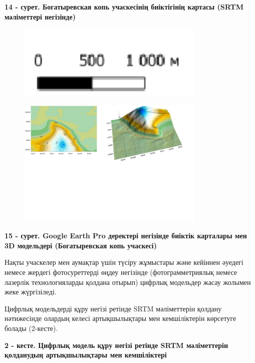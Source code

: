 {\bfseries 14 - сурет. Богатыревская копь учаскесінің биіктігінің картасы
(SRTM мәліметтері негізінде)}


\begin{figure}[H]
	\centering
	\includegraphics[width=0.8\textwidth]{media/ict2/image209}
	\caption*{}
\end{figure}

\begin{figure}[H]
	\centering
	\includegraphics[width=0.8\textwidth]{media/ict2/image218}
	\caption*{}
\end{figure}


{\bfseries 15 - сурет. Google Earth Pro деректері негізінде биіктік
карталары мен 3D модельдері (Богатыревская копь учаскесі)}

Нақты учаскелер мен аумақтар үшін түсіру жұмыстары және кейіннен әуедегі
немесе жердегі фотосуреттерді өңдеу негізінде (фотограмметриялық немесе
лазерлік технологияларды қолдана отырып) цифрлық модельдер жасау жолымен
жеке жүргізіледі.

Цифрлық модельдерді құру негізі ретінде SRTM мәліметтерін қолдану
нәтижесінде олардың келесі артықшылықтары мен кемшіліктерін көрсетуге
болады (2-кесте).

{\bfseries 2 - кесте. Цифрлық модель құру негізі ретінде SRTM мәліметтерін
қолданудың артықшылықтары мен кемшіліктері}

